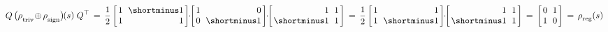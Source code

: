 \begin{align}
	Q\, \big( \rhotriv \!\oplus\mkern-1mu \rhosign \big)\mkern-2mu(s)\; Q^\top
	\,=\, \frac{1}{2}
	\begin{bmatrix} \hspace{1.5pt}
		1 &\mkern-7mu \shortminus1 \hspace*{1.5pt} \\ \hspace{1.5pt} 1 &\mkern-7mu \phantom{\shortminus}1 \hspace*{1.5pt}
	\end{bmatrix} \mkern-6mu \cdot\mkern-6mu
	\begin{bmatrix} \hspace{1.5pt}
		1 &\mkern-7mu \phantom{\shortminus}0 \hspace*{1.5pt} \\ \hspace{1.5pt} 0 &\mkern-7mu \shortminus1 \hspace*{1.5pt}
	\end{bmatrix} \mkern-6mu \cdot\mkern-6mu
	\begin{bmatrix} \hspace{1.5pt}
		\phantom{\shortminus}1 &\mkern-7mu 1 \hspace*{1.5pt} \\ \hspace{1.5pt} \shortminus1 &\mkern-7mu 1 \hspace*{1.5pt}
	\end{bmatrix}
	\,=\, \frac{1}{2}
	\begin{bmatrix} \hspace{1.5pt}
		1 &\mkern-7mu \phantom{\shortminus}1 \hspace*{1.5pt} \\ \hspace{1.5pt} 1 &\mkern-7mu \shortminus1 \hspace*{1.5pt}
	\end{bmatrix} \mkern-6mu \cdot\mkern-6mu
	\begin{bmatrix} \hspace{1.5pt}
		\phantom{\shortminus}1 &\mkern-7mu 1 \hspace*{1.5pt} \\ \hspace{1.5pt} \shortminus1 &\mkern-7mu 1 \hspace*{1.5pt}
	\end{bmatrix}
	\,=\, 
	\begin{bmatrix} \hspace{1.5pt}
		0 &\mkern-7mu 1 \hspace*{1.5pt} \\ \hspace{1.5pt} 1 &\mkern-7mu 0 \hspace*{1.5pt}
	\end{bmatrix}
	\,=\, \rhoreg(s)
\end{align}
